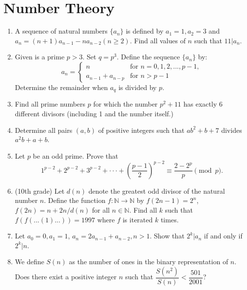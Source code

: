 \documentclass[12pt]{scrartcl}
\begin{document}
\section*{Number Theory}

\begin{enumerate}[resume]
    \item A sequence of natural numbers $\{a_{n}\}$ is defined by $a_{1}=1, a_{2}=3$ and $a_{n}=(n+1)a_{n-1}-na_{n-2}(n\ge2)$. Find all values of $n$ such that $11|a_{n}$.

    \item Given is a prime $p>3$. Set $q=p^{3}$. Define the sequence $\{a_{n}\}$ by:
    $$a_{n}=\begin{cases}n & \text{for } n=0,1,2,...,p-1,\\ a_{n-1}+a_{n-p} & \text{for } n>p-1\end{cases}$$
    Determine the remainder when $a_{q}$ is divided by $p$.

    \item Find all prime numbers $p$ for which the number $p^{2}+11$ has exactly 6 different divisors (including 1 and the number itself.)

    \item Determine all pairs $(a, b)$ of positive integers such that $ab^{2}+b+7$ divides $a^{2}b+a+b$.

    \item Let $p$ be an odd prime. Prove that 
    $$1^{p-2}+2^{p-2}+3^{p-2}+\cdot\cdot\cdot+\left(\dfrac{p-1}{2}\right)^{p-2}\equiv\dfrac{2-2^{p}}{p} \pmod p.$$

    \item (10th grade) Let $d(n)$ denote the greatest odd divisor of the natural number $n$. Define the function $f:\mathbb{N}\rightarrow\mathbb{N}$ by $f(2n-1)=2^{n}$, $f(2n)=n+2n/d(n)$ for all $n\in\mathbb{N}.$ Find all $k$ such that $f(f(...(1)...))=1997$ where $f$ is iterated $k$ times.

    \item Let $a_0=0, a_{1}=1$, $a_{n}=2a_{n-1}+a_{n-2}, n>1$. Show that $2^{k}|a_{n}$ if and only if $2^{k}|n.$

    \item We define $S(n)$ as the number of ones in the binary representation of $n$. Does there exist a positive integer $n$ such that $\dfrac{S(n^{2})}{S(n)}<\dfrac{501}{2001}$?


\end{enumerate}
\end{document}
